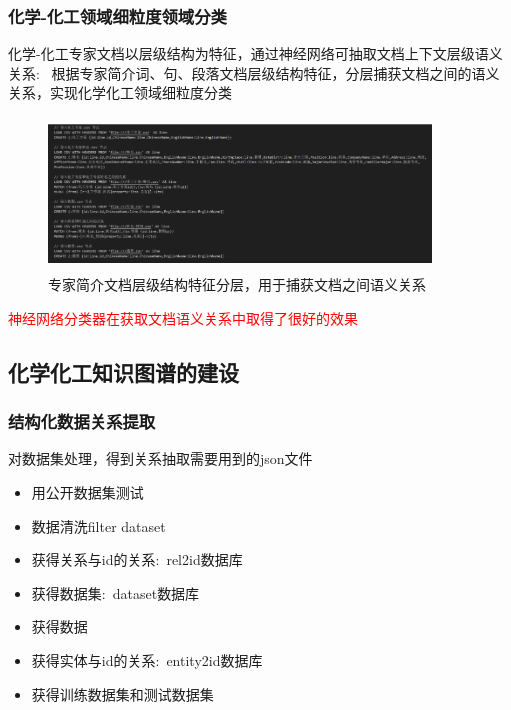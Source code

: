 \begin{frame}
	\frametitle{化学-化工领域细粒度领域分类}
化学-化工专家文档以层级结构为特征，通过神经网络可抽取文档上下文层级语义关系:~
根据专家简介词、句、段落文档层级结构特征，分层捕获文档之间的语义关系，实现化学化工领域细粒度分类
\begin{figure}[h!]
\centering
\includegraphics[height=1.60in,width=4.00in,viewport=0 0 210 80,clip]{Figures/KG_Chem-extract.png}
\caption{\tiny 专家简介文档层级结构特征分层，用于捕获文档之间语义关系}%
\label{Fig:KG_Chem-Extract}
\end{figure}
\textcolor{red}{神经网络分类器在获取文档语义关系中取得了很好的效果}
\end{frame}

\subsection{化学化工知识图谱的建设}
\begin{frame}
	\frametitle{结构化数据关系提取}
	对数据集处理，得到关系抽取需要用到的\textrm{json}文件
\begin{itemize}
	\item 用公开数据集测试%
	\item 数据清洗\textrm{filter dataset}
	\item 获得关系与\textrm{id}的关系:~\textrm{rel2id}数据库
	\item 获得数据集:~\textrm{dataset}数据库
	\item 获得数据
	\item 获得实体与\textrm{id}的关系:~\textrm{entity2id}数据库
	\item 获得训练数据集和测试数据集
\end{itemize}
\end{frame}

